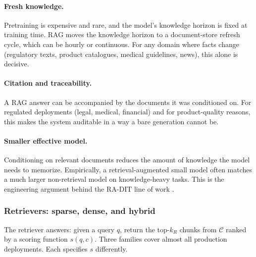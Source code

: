 \paragraph{Fresh knowledge.} Pretraining is expensive and rare, and
the model's knowledge horizon is fixed at training time. RAG moves
the knowledge horizon to a document-store refresh cycle, which can
be hourly or continuous. For any domain where facts change
(regulatory texts, product catalogues, medical guidelines, news),
this alone is decisive.

\paragraph{Citation and traceability.} A RAG answer can be
accompanied by the documents it was conditioned on. For regulated
deployments (legal, medical, financial) and for product-quality
reasons, this makes the system auditable in a way a bare
generation cannot be.

\paragraph{Smaller effective model.} Conditioning on relevant
documents reduces the amount of knowledge the model needs to
memorize. Empirically, a retrieval-augmented small model often
matches a much larger non-retrieval model on knowledge-heavy
tasks. This is the engineering argument behind the RA-DIT line of
work \citep{lin2024radit}.

\subsubsection{Retrievers: sparse, dense, and hybrid}

The retriever answers: given a query $q$, return the top-$k_R$
chunks from $\mathcal{C}$ ranked by a scoring function
$s(q, c)$. Three families cover almost all production deployments.
Each specifies $s$ differently.

